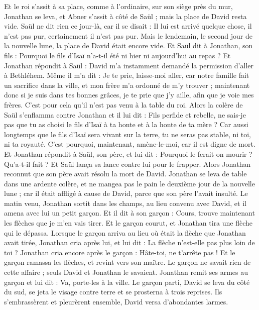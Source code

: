 \begin{multicols}{2}
Et le roi s'assit à sa place, comme à l'ordinaire, sur son siège près du mur, Jonathan se leva, et Abner s'assit à côté de Saül ; mais la place de David resta vide.
Saül ne dit rien ce jour-là, car il se disait : Il lui est arrivé quelque chose, il n'est pas pur, certainement il n'est pas pur.
Mais le lendemain, le second jour de la nouvelle lune, la place de David était encore vide. Et Saül dit à Jonathan, son fils : Pourquoi le fils d'Isaï n'a-t-il été ni hier ni aujourd'hui au repas ?
Et Jonathan répondit à Saül : David m'a instamment demandé la permission d'aller à Bethléhem.
Même il m'a dit : Je te prie, laisse-moi aller, car notre famille fait un sacrifice dans la ville, et mon frère m'a ordonné de m'y trouver ; maintenant donc si je suis dans tes bonnes grâces, je te prie que j'y aille, afin que je voie mes frères. C'est pour cela qu'il n'est pas venu à la table du roi.
Alors la colère de Saül s'enflamma contre Jonathan et il lui dit : Fils perfide et rebelle, ne sais-je pas que tu as choisi le fils d'Isaï à ta honte et à la honte de ta mère ?
Car aussi longtemps que le fils d'Isaï sera vivant sur la terre, tu ne seras pas stable, ni toi, ni ta royauté. C'est pourquoi, maintenant, amène-le-moi, car il est digne de mort.
Et Jonathan répondit à Saül, son père, et lui dit : Pourquoi le ferait-on mourir ? Qu'a-t-il fait ?
Et Saül lança sa lance contre lui pour le frapper. Alors Jonathan reconnut que son père avait résolu la mort de David.
Jonathan se leva de table dans une ardente colère, et ne mangea pas le pain le deuxième jour de la nouvelle lune ; car il était affligé à cause de David, parce que son père l'avait insulté.
Le matin venu, Jonathan sortit dans les champs, au lieu convenu avec David, et il amena avec lui un petit garçon.
Et il dit à son garçon : Cours, trouve maintenant les flèches que je m'en vais tirer. Et le garçon courut, et Jonathan tira une flèche qui le dépassa.
Lorsque le garçon arriva au lieu où était la flèche que Jonathan avait tirée, Jonathan cria après lui, et lui dit : La flèche n'est-elle pas plus loin de toi ?
Jonathan cria encore après le garçon : Hâte-toi, ne t'arrête pas ! Et le garçon ramassa les flèches, et revint vers son maître.
Le garçon ne savait rien de cette affaire ; seuls David et Jonathan le savaient.
Jonathan remit ses armes au garçon et lui dit : Va, porte-les à la ville.
Le garçon parti, David se leva du côté du sud, se jeta le visage contre terre et se prosterna à trois reprises. Ils s'embrassèrent et pleurèrent ensemble, David versa d'abondantes larmes.

\end{multicols}
